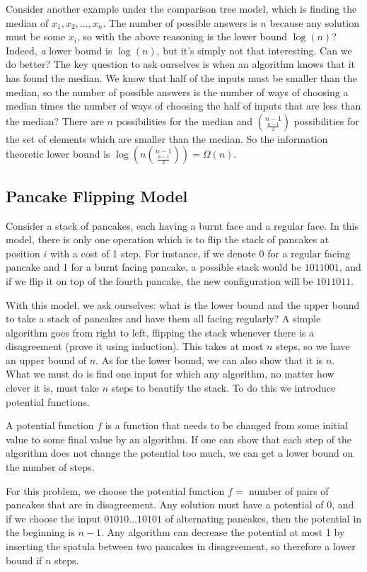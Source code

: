 Consider another example under the comparison tree model, which is
finding the median of $x_1, x_2, ..., x_n$. The number of possible
answers is $n$ because any solution must be some $x_i$, so with
the above reasoning is the lower bound $\log(n)$? Indeed, \emph{a}
lower bound is $\log(n)$, but it's simply not that interesting.
Can we do better? The key question to ask ourselves is when an
algorithm knows that it has found the median. We know that half of the inputs must be smaller than the median, so the number of possible answers is the number of ways of choosing a median times the number of ways of choosing the half of inputs that are less than the median?
There are $n$ possibilities for the median and 
$\binom{n - 1}{\frac{n-1}{2}}$ possibilities for the set of elements
which are smaller than the median. So the information theoretic
lower bound is $\log(n\binom{n - 1}{\frac{n-1}{2}}) = \Omega(n)$.

\subsection{Pancake Flipping Model}

Consider a stack of pancakes, each having a burnt face and a regular face. In this model, there is only one operation which is to flip
the stack of pancakes at position $i$ with a cost of 1 step.
For instance, if we denote 0 for a regular facing pancake and 1
for a burnt facing pancake, a possible stack would be
$1011001$, and if we flip it on top of the fourth pancake, the
new configuration will be $1011011$.

With this model, we ask ourselves: what is the lower bound and
the upper bound to take a stack of pancakes and have them all facing regularly? A simple algorithm goes from right to left, flipping
the stack whenever there is a disagreement (prove it using
induction). This takes at most $n$ steps, so we have an upper bound
of $n$. As for the lower bound, we can also show that it is $n$.
What we must do is find one input for which any algorithm, no matter how clever it is, must take $n$ steps to beautify the stack. To
do this we introduce potential functions.

\begin{definition}
    A potential function $f$ is a function that needs to be changed from some initial value to some final value by an algorithm. If one can show that each step of the algorithm does not change the
    potential too much, we can get a lower bound on the number of steps.
\end{definition}

For this problem, we choose the potential function $f = $ number of pairs of pancakes that are in disagreement. Any solution must
have a potential of 0, and if we choose the input $01010...10101$
of alternating pancakes, then the potential in the beginning is $n - 1$. Any algorithm can decrease the potential at most 1 by inserting
the spatula between two pancakes in disagreement, so therefore
a lower bound if $n$ steps.





